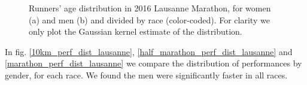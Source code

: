 \documentclass[fleqn,10pt]{wlscirep}
\begin{document}
		\begin{figure}[h]	
			\centering
			
			
			\caption{Runners' age distribution in 2016 Lausanne Marathon, for women (a) and men (b) and divided by race (color-coded). For clarity we only plot the Gaussian kernel estimate of the distribution.}
		\end{figure}		 		
		 		
 		
 		In fig. \ref{10km_perf_dist_lausanne}, \ref{half_marathon_perf_dist_lausanne} and \ref{marathon_perf_dist_lausanne} we compare the distribution of performances by gender,  for each race. We found the men were significantly faster in all races.
 				 		
\end{document}

